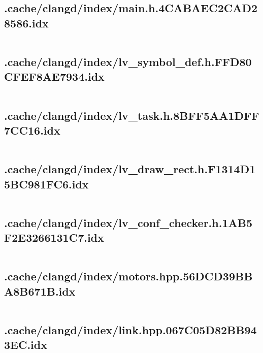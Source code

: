 \subsection{.cache/clangd/index/main.h.4CABAEC2CAD28586.idx}
\inputminted[linenos,tabsize=2,breaklines, breakanywhere]{c}{main.h.4CABAEC2CAD28586.idx}
\pagebreak

\subsection{.cache/clangd/index/lv_symbol_def.h.FFD80CFEF8AE7934.idx}
\inputminted[linenos,tabsize=2,breaklines, breakanywhere]{c}{lv_symbol_def.h.FFD80CFEF8AE7934.idx}
\pagebreak

\subsection{.cache/clangd/index/lv_task.h.8BFF5AA1DFF7CC16.idx}
\inputminted[linenos,tabsize=2,breaklines, breakanywhere]{c}{lv_task.h.8BFF5AA1DFF7CC16.idx}
\pagebreak

\subsection{.cache/clangd/index/lv_draw_rect.h.F1314D15BC981FC6.idx}
\inputminted[linenos,tabsize=2,breaklines, breakanywhere]{c}{lv_draw_rect.h.F1314D15BC981FC6.idx}
\pagebreak

\subsection{.cache/clangd/index/lv_conf_checker.h.1AB5F2E3266131C7.idx}
\inputminted[linenos,tabsize=2,breaklines, breakanywhere]{c}{lv_conf_checker.h.1AB5F2E3266131C7.idx}
\pagebreak

\subsection{.cache/clangd/index/motors.hpp.56DCD39BBA8B671B.idx}
\inputminted[linenos,tabsize=2,breaklines, breakanywhere]{c}{motors.hpp.56DCD39BBA8B671B.idx}
\pagebreak

\subsection{.cache/clangd/index/link.hpp.067C05D82BB943EC.idx}
\inputminted[linenos,tabsize=2,breaklines, breakanywhere]{c}{link.hpp.067C05D82BB943EC.idx}
\pagebreak


